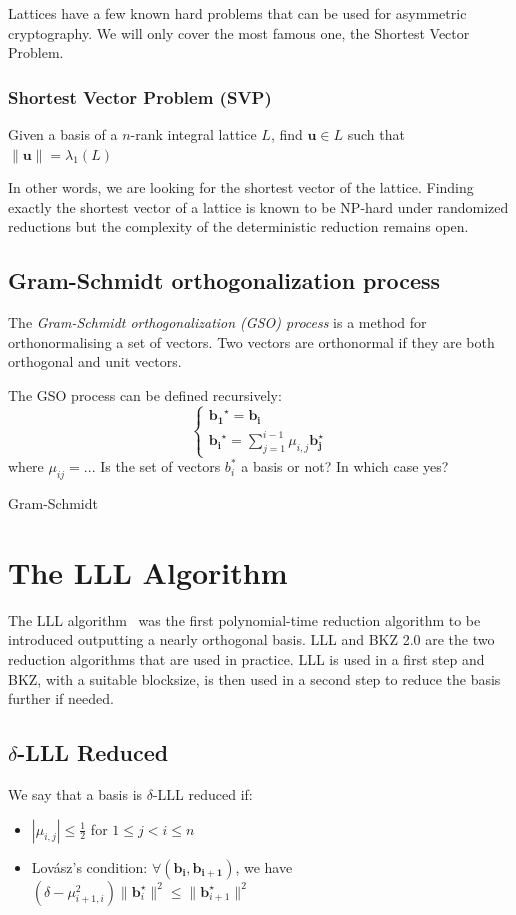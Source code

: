 \documentclass[10pt, a4paper]{article}
\newcommand{\my}[1]{{\color{blue} #1 }}
\renewcommand{\vec}[1]{\mathbf{#1}}
\begin{document}
Lattices have a few known hard problems that can be used for asymmetric cryptography. We will only cover the most famous one, the Shortest Vector Problem.

\subsubsection{Shortest Vector Problem (SVP)}

Given a basis of a $n$-rank integral lattice $L$, find $\vec{u} \in L$ such that $\|\vec{u}\| = \lambda_1 (L)$

In other words, we are looking for the shortest vector of the lattice. Finding exactly the shortest vector of a lattice is known to be NP-hard under randomized reductions\cite{Ajtai:1998:SVP} but the complexity of the deterministic reduction remains open.

\subsection{Gram-Schmidt orthogonalization process}
The \emph{Gram-Schmidt orthogonalization (\emph GSO) process} is a method for orthonormalising a set of vectors. Two vectors are orthonormal if they are both orthogonal and unit vectors. 

The GSO process  can be defined recursively:
\[
\begin{cases}
\vec{b_1}^{\star} = \vec{b_i}  \\
\vec{b_i}^{\star} = \displaystyle\sum^{i-1}_{j=1} \mu_{i,j} \vec{b_j^\star}
\end{cases}
\]
where \my{$\mu_{ij} = ..$. Is the set of vectors $b_i^*$ a basis or not? In which case yes?}

Gram-Schmidt 

\section{The LLL Algorithm}

The LLL algorithm~\cite{lllpaper} was the first polynomial-time reduction algorithm to be introduced outputting a nearly orthogonal basis. LLL and BKZ 2.0 are the two reduction algorithms that are used in practice. LLL is used in a first step and BKZ, with a suitable blocksize, is then used in a second step to reduce the basis further if needed.

\subsection{$\delta$-LLL Reduced}
We say that a basis is $\delta$-LLL reduced if:
\begin{itemize}
\item $| \mu_{i,j}| \leq \frac{1}{2} $ for $1 \leq j < i \leq n$
\item Lovász's condition: $\forall (\vec{b_i, b_{i+1}})$, we have $(\delta - \mu^2_{i+1,i}) \|\vec{b}^{\star}_{i}\|^2 \leq \| \vec{b}^{\star}_{i+1} \|^2$
\end{itemize}
\end{document}
